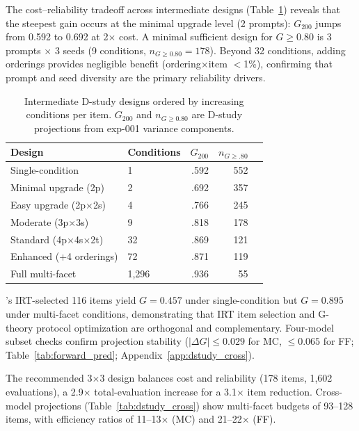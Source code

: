 The cost--reliability tradeoff across intermediate designs (Table~\ref{tab:intermediate_dstudy}) reveals that the steepest gain occurs at the minimal upgrade level (2 prompts): $G_{200}$ jumps from 0.592 to 0.692 at 2$\times$ cost. A minimal sufficient design for $G \geq 0.80$ is 3 prompts $\times$ 3 seeds (9 conditions, $n_{G \geq 0.80} = 178$). Beyond 32 conditions, adding orderings provides negligible benefit (ordering$\times$item $<$1\%), confirming that prompt and seed diversity are the primary reliability drivers.

\begin{table}[t]
\centering
\caption{Intermediate D-study designs ordered by increasing conditions per item. $G_{200}$ and $n_{G \geq 0.80}$ are D-study projections from exp-001 variance components.}
\label{tab:intermediate_dstudy}
\scriptsize
\begin{tabular}{llrrr}
\toprule
Design & Conditions & $G_{200}$ & $n_{G{\geq}.80}$ \\
\midrule
Single-condition & 1 & .592 & 552 \\
Minimal upgrade (2p) & 2 & .692 & 357 \\
Easy upgrade (2p$\times$2s) & 4 & .766 & 245 \\
Moderate (3p$\times$3s) & 9 & .818 & 178 \\
Standard (4p$\times$4s$\times$2t) & 32 & .869 & 121 \\
Enhanced (+4 orderings) & 72 & .871 & 119 \\
Full multi-facet & 1{,}296 & .936 & 55 \\
\bottomrule
\end{tabular}
\end{table}

\citet{zhou2026irt}'s IRT-selected 116 items yield $G = 0.457$ under single-condition but $G = 0.895$ under multi-facet conditions, demonstrating that IRT item selection and G-theory protocol optimization are orthogonal and complementary. Four-model subset checks confirm projection stability ($|\Delta G| \leq 0.029$ for MC, $\leq 0.065$ for FF; Table~\ref{tab:forward_pred}; Appendix~\ref{app:dstudy_cross}).

The recommended 3$\times$3 design balances cost and reliability (178 items, 1,602 evaluations), a 2.9$\times$ total-evaluation increase for a 3.1$\times$ item reduction. Cross-model projections (Table~\ref{tab:dstudy_cross}) show multi-facet budgets of 93--128 items, with efficiency ratios of 11--13$\times$ (MC) and 21--22$\times$ (FF).

